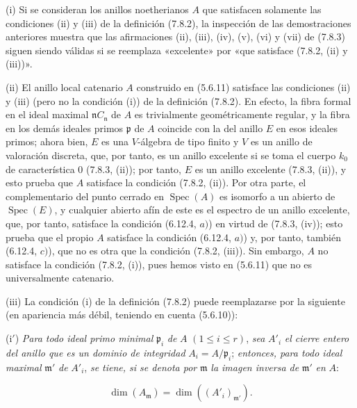 \begin{remarks}[7.8.4]
\upshape
(i) Si se consideran los anillos noetherianos $A$ que satisfacen solamente
las condiciones (ii) y (iii) de la definición (7.8.2), la inspección de las
demostraciones anteriores muestra que las afirmaciones (ii), (iii), (iv),
(v), (vi) y (vii) de (7.8.3) siguen siendo válidas si se reemplaza «excelente»
por «que satisface (7.8.2, (ii) y (iii))».

(ii) El anillo local catenario $A$ construido en (5.6.11) satisface las
condiciones (ii) y (iii) (pero no la condición (i)) de la definición (7.8.2).
En efecto, la fibra formal en el ideal maximal $\mathfrak n C_{\mathfrak n}$
de $A$ es trivialmente geométricamente regular, y la fibra en los demás
ideales primos $\mathfrak p$ de $A$ coincide con la del anillo $E$ en esos
ideales primos; ahora bien, $E$ es una $V$-álgebra de tipo finito y $V$ es
un anillo de valoración discreta, que, por tanto, es un anillo excelente
si se toma el cuerpo $k_0$ de característica $0$ (7.8.3, (ii)); por tanto,
$E$ es un anillo excelente (7.8.3, (ii)), y esto prueba que $A$ satisface
la condición (7.8.2, (ii)). Por otra parte, el complementario del punto
cerrado en $\operatorname{Spec}(A)$ es isomorfo a un abierto de
$\operatorname{Spec}(E)$, y cualquier abierto afín de este es el espectro
de un anillo
excelente, que, por tanto, satisface la condición (6.12.4, $a)$) en virtud
de (7.8.3, (iv));
esto prueba que el propio $A$ satisface la condición (6.12.4, $a)$) y, por
tanto, también (6.12.4, $c)$), que no es otra que la condición (7.8.2, (iii)).
Sin embargo, $A$ no satisface la condición (7.8.2, (i)), pues hemos visto
en (5.6.11) que no es universalmente catenario.

(iii) La condición (i) de la definición (7.8.2) puede reemplazarse por la
siguiente (en apariencia más débil, teniendo en cuenta (5.6.10)):

(i$'$) \emph{Para todo ideal primo minimal} $\mathfrak p_i$ \emph{de} $A$
$(1\leq i\leq r)$, \emph{sea} $A'_i$ \emph{el cierre entero del anillo que
es un dominio de integridad} $A_i=A/\mathfrak p_i$; \emph{entonces, para
todo ideal maximal} $\mathfrak m'$ \emph{de} $A'_i$, \emph{se tiene, si
se denota por} $\mathfrak m$ \emph{la imagen inversa de} $\mathfrak m'$
\emph{en} $A$:
\begin{env}[7.8.4.1]
\label{IV.2.s7.8.4.1-fr}
\[
\dim(A_{\mathfrak m})=\dim((A'_i)_{\mathfrak m'}).
\]
\end{env}


\end{remarks}
